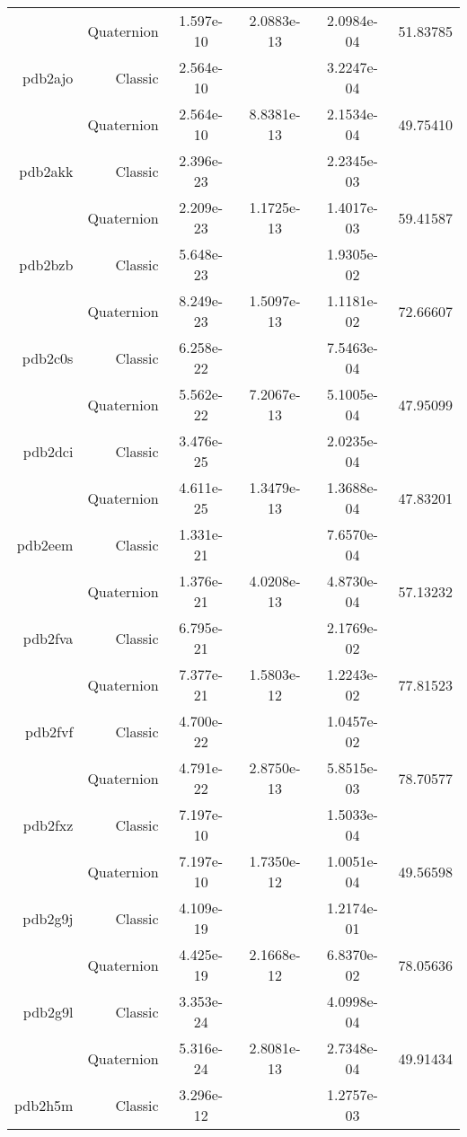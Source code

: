 \begin{xltabular}{\textwidth}{r|rS[table-format=1.3e+2]S[table-format=1.4e+2]S[table-format=1.4e+2]S[table-format=-1.5]}
& Quaternion & 1.597e-10 & 2.0883e-13 & 2.0984e-04 & 51.83785\\  \addlinespace
pdb2ajo & Classic & 2.564e-10 &  & 3.2247e-04 & \\
& Quaternion & 2.564e-10 & 8.8381e-13 & 2.1534e-04 & 49.75410\\  \addlinespace
pdb2akk & Classic & 2.396e-23 &  & 2.2345e-03 & \\
& Quaternion & 2.209e-23 & 1.1725e-13 & 1.4017e-03 & 59.41587\\  \addlinespace
pdb2bzb & Classic & 5.648e-23 &  & 1.9305e-02 & \\
& Quaternion & 8.249e-23 & 1.5097e-13 & 1.1181e-02 & 72.66607\\  \addlinespace
pdb2c0s & Classic & 6.258e-22 &  & 7.5463e-04 & \\
& Quaternion & 5.562e-22 & 7.2067e-13 & 5.1005e-04 & 47.95099\\  \addlinespace
pdb2dci & Classic & 3.476e-25 &  & 2.0235e-04 & \\
& Quaternion & 4.611e-25 & 1.3479e-13 & 1.3688e-04 & 47.83201\\  \addlinespace
pdb2eem & Classic & 1.331e-21 &  & 7.6570e-04 & \\
& Quaternion & 1.376e-21 & 4.0208e-13 & 4.8730e-04 & 57.13232\\  \addlinespace
pdb2fva & Classic & 6.795e-21 &  & 2.1769e-02 & \\
& Quaternion & 7.377e-21 & 1.5803e-12 & 1.2243e-02 & 77.81523\\  \addlinespace
pdb2fvf & Classic & 4.700e-22 &  & 1.0457e-02 & \\
& Quaternion & 4.791e-22 & 2.8750e-13 & 5.8515e-03 & 78.70577\\  \addlinespace
pdb2fxz & Classic & 7.197e-10 &  & 1.5033e-04 & \\
& Quaternion & 7.197e-10 & 1.7350e-12 & 1.0051e-04 & 49.56598\\  \addlinespace
pdb2g9j & Classic & 4.109e-19 &  & 1.2174e-01 & \\
& Quaternion & 4.425e-19 & 2.1668e-12 & 6.8370e-02 & 78.05636\\  \addlinespace
pdb2g9l & Classic & 3.353e-24 &  & 4.0998e-04 & \\
& Quaternion & 5.316e-24 & 2.8081e-13 & 2.7348e-04 & 49.91434\\  \addlinespace
pdb2h5m & Classic & 3.296e-12 &  & 1.2757e-03 & \\

\end{xltabular}

